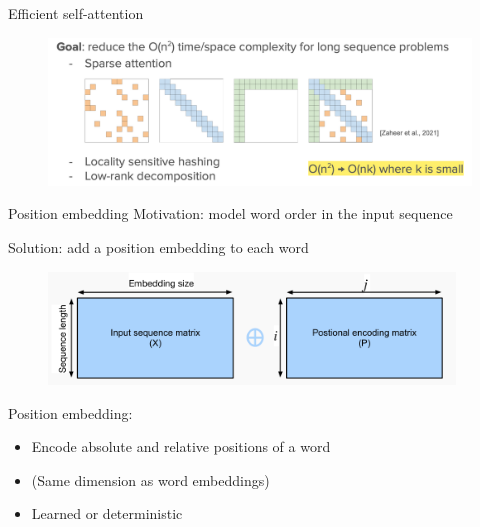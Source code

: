 \documentclass[usenames,dvipsnames,11pt,aspectratio=169]{beamer}
\begin{document}
\begin{frame}
    {Efficient self-attention}
    \begin{figure}
        \includegraphics[width=\textwidth]{figures/efficient}
    \end{figure}
\end{frame}

\begin{frame}
    {Position embedding}
    Motivation: model word order in the input sequence

    Solution: add a position embedding to each word
    \begin{figure}
        \includegraphics[height=3cm]{figures/position-embedding}
    \end{figure}

    Position embedding:\\
    \begin{itemize}
        \item Encode absolute and relative positions of a word
        \item (Same dimension as word embeddings)
        \item Learned or deterministic 
    \end{itemize}
\end{frame}

\end{document}
